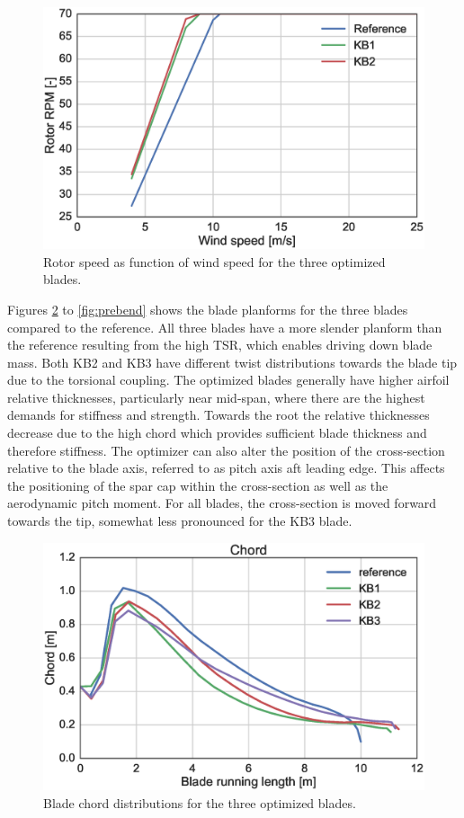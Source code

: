 \begin{figure}[!ht]
\begin{center}
	\includegraphics[width=.85\linewidth]{figures/KB_rpm.eps}
\end{center}
\caption{Rotor speed as function of wind speed for the three optimized blades.}
\label{fig:rpm}
\end{figure}

\clearpage

Figures \ref{fig:chord} to \ref{fig:prebend} shows the blade planforms for the three blades compared to the reference.
All three blades have a more slender planform than the reference resulting from the high TSR, which enables driving down blade mass.
Both KB2 and KB3 have different twist distributions towards the blade tip due to the torsional coupling.
The optimized blades generally have higher airfoil relative thicknesses, particularly near mid-span, where there are the highest demands for stiffness and strength.
Towards the root the relative thicknesses decrease due to the high chord which provides sufficient blade thickness and therefore stiffness.
The optimizer can also alter the position of the cross-section relative to the blade axis, referred to as pitch axis aft leading edge.
This affects the positioning of the spar cap within the cross-section as well as the aerodynamic pitch moment.
For all blades, the cross-section is moved forward towards the tip, somewhat less pronounced for the KB3 blade. 

\begin{figure}[!ht]
\begin{center}
	\includegraphics[width=.85\linewidth]{figures/KB_chord.eps}
\end{center}
\caption{Blade chord distributions for the three optimized blades.}
\label{fig:chord}
\end{figure}


